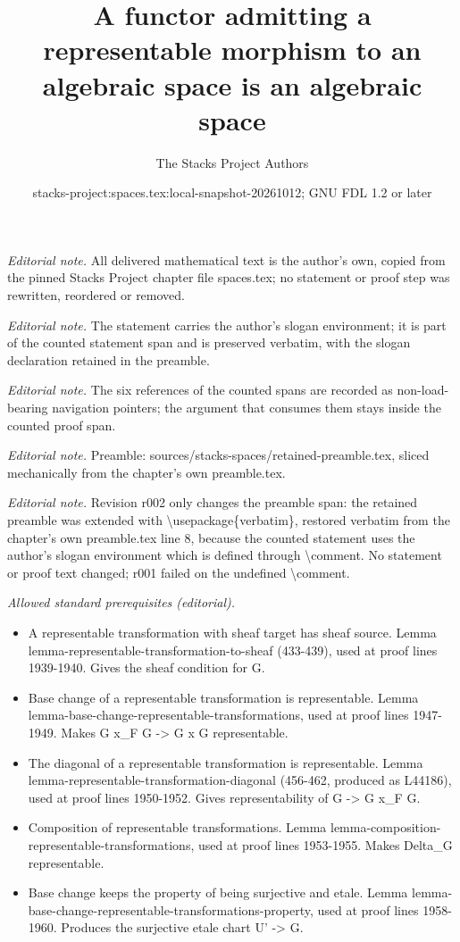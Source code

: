 \documentclass[10pt,a4paper]{amsart}
\title{A functor admitting a representable morphism to an algebraic space is an algebraic space}
\author{The Stacks Project Authors}
\date{stacks-project:spaces.tex:local-snapshot-20261012; GNU FDL 1.2 or later}
\theoremstyle{plain}
\theoremstyle{definition}
\theoremstyle{remark}
\numberwithin{equation}{subsection}
\begin{document}
\maketitle
\setcounter{subsection}{1}
\noindent\textit{Editorial note.} All delivered mathematical text is the author's own, copied from the pinned Stacks Project chapter file spaces.tex; no statement or proof step was rewritten, reordered or removed.\par\medskip
\noindent\textit{Editorial note.} The statement carries the author's slogan environment; it is part of the counted statement span and is preserved verbatim, with the slogan declaration retained in the preamble.\par\medskip
\noindent\textit{Editorial note.} The six references of the counted spans are recorded as non-load-bearing navigation pointers; the argument that consumes them stays inside the counted proof span.\par\medskip
\noindent\textit{Editorial note.} Preamble: sources/stacks-spaces/retained-preamble.tex, sliced mechanically from the chapter's own preamble.tex.\par\medskip
\noindent\textit{Editorial note.} Revision r002 only changes the preamble span: the retained preamble was extended with \textbackslash{}usepackage\{verbatim\}, restored verbatim from the chapter's own preamble.tex line 8, because the counted statement uses the author's slogan environment which is defined through \textbackslash{}comment. No statement or proof text changed; r001 failed on the undefined \textbackslash{}comment.\par\medskip
\noindent\textit{Allowed standard prerequisites (editorial).}\begin{itemize}
\item A representable transformation with sheaf target has sheaf source. Lemma lemma-representable-transformation-to-sheaf (433-439), used at proof lines 1939-1940. Gives the sheaf condition for G.
\item Base change of a representable transformation is representable. Lemma lemma-base-change-representable-transformations, used at proof lines 1947-1949. Makes G x\_F G -> G x G representable.
\item The diagonal of a representable transformation is representable. Lemma lemma-representable-transformation-diagonal (456-462, produced as L44186), used at proof lines 1950-1952. Gives representability of G -> G x\_F G.
\item Composition of representable transformations. Lemma lemma-composition-representable-transformations, used at proof lines 1953-1955. Makes Delta\_G representable.
\item Base change keeps the property of being surjective and etale. Lemma lemma-base-change-representable-transformations-property, used at proof lines 1958-1960. Produces the surjective etale chart U' -> G.
\end{itemize}\medskip
\end{document}

